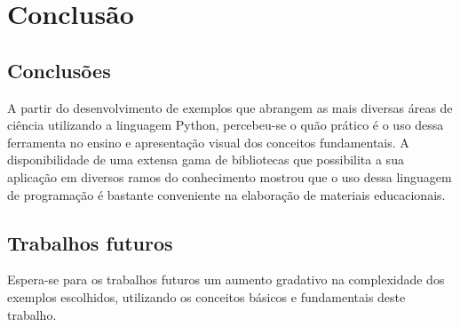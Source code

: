 \chapter{Conclusão}

\section{Conclusões}
A partir do desenvolvimento de exemplos que abrangem as mais diversas áreas de ciência utilizando a linguagem Python, percebeu-se o quão prático é o uso dessa ferramenta no ensino e apresentação visual dos conceitos fundamentais. A disponibilidade de uma extensa gama de bibliotecas que possibilita a sua aplicação em diversos ramos do conhecimento mostrou que o uso dessa linguagem de programação é bastante conveniente na elaboração de materiais educacionais. 

\section{Trabalhos futuros}
Espera-se para os trabalhos futuros um aumento gradativo na complexidade dos exemplos escolhidos, utilizando os conceitos básicos e fundamentais deste trabalho.